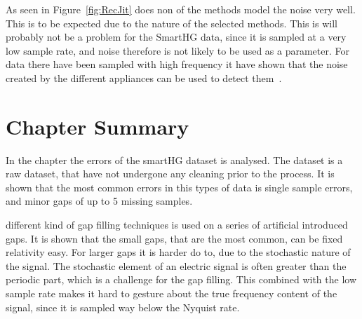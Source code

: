 As seen in Figure~\ref{fig:RecJit} does non of the methods model the noise very well. This is to be expected due to the nature of the selected methods. This is will probably not be a problem for the SmartHG data, since it is sampled at a very low sample rate, and noise therefore is not likely to be used as a parameter. For data there have been sampled with high frequency it have shown that the noise created by the different appliances can be used to detect them~\citep{RefWorks:17}. 

\section{Chapter Summary}
In the chapter the errors of the smartHG dataset is analysed. The dataset is a raw dataset, that have not undergone any cleaning prior to the process. It is shown that the most common errors in this types of data is single sample errors, and minor gaps of up to 5 missing samples.  

different kind of gap filling techniques is used on a series of artificial introduced gaps. It is shown that the small gaps, that are the most common, can be fixed relativity easy. For larger gaps it is harder do to, due to the stochastic nature of the signal. The stochastic element of an electric signal is often greater than the periodic part, which is a challenge for the gap filling. This combined with the low sample rate makes it hard to gesture about the true frequency content of the signal, since it is sampled way below the Nyquist rate.  
